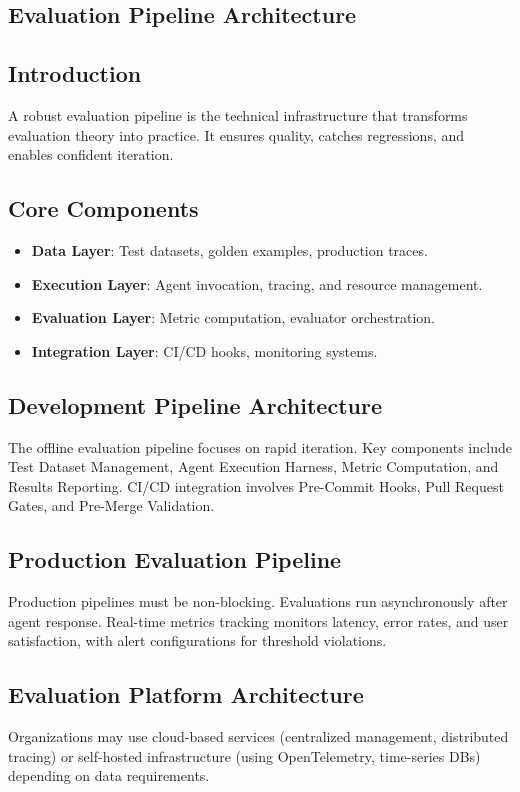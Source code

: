 \begin{TNtwocol}
\section{Evaluation Pipeline Architecture }
\subsection{Introduction}
A robust evaluation pipeline is the technical infrastructure that transforms evaluation theory into practice. It ensures quality, catches regressions, and enables confident iteration.

\subsection{Core Components}
\begin{itemize}
    \item \textbf{Data Layer}: Test datasets, golden examples, production traces.
    \item \textbf{Execution Layer}: Agent invocation, tracing, and resource management.
    \item \textbf{Evaluation Layer}: Metric computation, evaluator orchestration.
    \item \textbf{Integration Layer}: CI/CD hooks, monitoring systems.
\end{itemize}

\subsection{Development Pipeline Architecture}
The offline evaluation pipeline focuses on rapid iteration. Key components include Test Dataset Management, Agent Execution Harness, Metric Computation, and Results Reporting. CI/CD integration involves Pre-Commit Hooks, Pull Request Gates, and Pre-Merge Validation.

\subsection{Production Evaluation Pipeline}
Production pipelines must be non-blocking. Evaluations run asynchronously after agent response. Real-time metrics tracking monitors latency, error rates, and user satisfaction, with alert configurations for threshold violations.

\subsection{Evaluation Platform Architecture}
Organizations may use cloud-based services (centralized management, distributed tracing) or self-hosted infrastructure (using OpenTelemetry, time-series DBs) depending on data requirements.


\end{TNtwocol}
